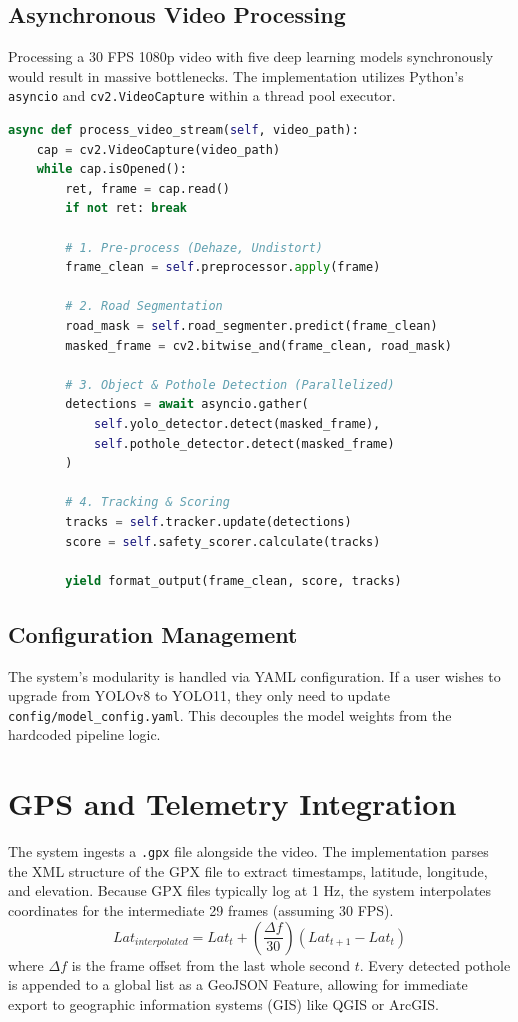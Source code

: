 \subsection{Asynchronous Video Processing}
Processing a 30 FPS 1080p video with five deep learning models synchronously would result in massive bottlenecks. The implementation utilizes Python's \texttt{asyncio} and \texttt{cv2.VideoCapture} within a thread pool executor.
\begin{lstlisting}[language=Python, caption=Simplified Inference Loop]
async def process_video_stream(self, video_path):
    cap = cv2.VideoCapture(video_path)
    while cap.isOpened():
        ret, frame = cap.read()
        if not ret: break
        
        # 1. Pre-process (Dehaze, Undistort)
        frame_clean = self.preprocessor.apply(frame)
        
        # 2. Road Segmentation
        road_mask = self.road_segmenter.predict(frame_clean)
        masked_frame = cv2.bitwise_and(frame_clean, road_mask)
        
        # 3. Object & Pothole Detection (Parallelized)
        detections = await asyncio.gather(
            self.yolo_detector.detect(masked_frame),
            self.pothole_detector.detect(masked_frame)
        )
        
        # 4. Tracking & Scoring
        tracks = self.tracker.update(detections)
        score = self.safety_scorer.calculate(tracks)
        
        yield format_output(frame_clean, score, tracks)
\end{lstlisting}

\subsection{Configuration Management}
The system's modularity is handled via YAML configuration. If a user wishes to upgrade from YOLOv8 to YOLO11, they only need to update \texttt{config/model\_config.yaml}. This decouples the model weights from the hardcoded pipeline logic.

\section{GPS and Telemetry Integration}
The system ingests a \texttt{.gpx} file alongside the video. The implementation parses the XML structure of the GPX file to extract timestamps, latitude, longitude, and elevation. Because GPX files typically log at 1 Hz, the system interpolates coordinates for the intermediate 29 frames (assuming 30 FPS).
\begin{equation}
    Lat_{interpolated} = Lat_t + \left( \frac{\Delta f}{30} \right) (Lat_{t+1} - Lat_t)
\end{equation}
where $\Delta f$ is the frame offset from the last whole second $t$.
Every detected pothole is appended to a global list as a GeoJSON Feature, allowing for immediate export to geographic information systems (GIS) like QGIS or ArcGIS.


